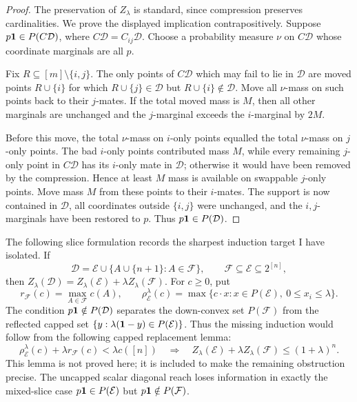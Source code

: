 \documentclass[12pt]{article}
\begin{document}
\begin{proof}
The preservation of \(Z_\lambda\) is standard, since compression preserves
cardinalities.  We prove the displayed implication contrapositively.  Suppose
\(p{\bf1}\in P(C\mathcal D)\), where \(C\mathcal D=C_{ij}\mathcal D\).  Choose a
probability measure \(\nu\) on \(C\mathcal D\) whose coordinate marginals are all
\(p\).

Fix \(R\subseteq[m]\setminus\{i,j\}\).  The only points of \(C\mathcal D\) which
may fail to lie in \(\mathcal D\) are moved points \(R\cup\{i\}\) for which
\(R\cup\{j\}\in\mathcal D\) but \(R\cup\{i\}\notin\mathcal D\).  Move all
\(\nu\)-mass on such points back to their \(j\)-mates.  If the total moved mass
is \(M\), then all other marginals are unchanged and the \(j\)-marginal exceeds
the \(i\)-marginal by \(2M\).

Before this move, the total \(\nu\)-mass on \(i\)-only points equalled the
total \(\nu\)-mass on \(j\)-only points.  The bad \(i\)-only points contributed
mass \(M\), while every remaining \(j\)-only point in \(C\mathcal D\) has its
\(i\)-only mate in \(\mathcal D\); otherwise it would have been removed by the
compression.  Hence at least \(M\) mass is available on swappable \(j\)-only
points.  Move mass \(M\) from these points to their \(i\)-mates.  The support is
now contained in \(\mathcal D\), all coordinates outside \(\{i,j\}\) were
unchanged, and the \(i,j\)-marginals have been restored to \(p\).  Thus
\(p{\bf1}\in P(\mathcal D)\).
\end{proof}

The following slice formulation records the sharpest induction target I have
isolated.  If
\[
 \mathcal D=\mathcal E\cup\{A\cup\{n+1\}:A\in\mathcal F\},\qquad
 \mathcal F\subseteq\mathcal E\subseteq2^{[n]},
\]
then \(Z_\lambda(\mathcal D)=Z_\lambda(\mathcal E)+\lambda Z_\lambda(\mathcal F)\).
For \(c\ge0\), put
\[
 r_{\mathcal F}(c)=\max_{A\in\mathcal F}c(A),\qquad
 \rho^\lambda_{\mathcal E}(c)=
 \max\{c\cdot x:x\in P(\mathcal E),\ 0\le x_i\le\lambda\}.
\]
The condition \(p{\bf1}\notin P(\mathcal D)\) separates the down-convex set
\(P(\mathcal F)\) from the reflected capped set
\(\{y:\lambda({\bf1}-y)\in P(\mathcal E)\}\).  Thus the missing induction would
follow from the following capped replacement lemma:
\[
 \rho^\lambda_{\mathcal E}(c)+\lambda r_{\mathcal F}(c)<\lambda c([n])
 \quad\Longrightarrow\quad
 Z_\lambda(\mathcal E)+\lambda Z_\lambda(\mathcal F)\le(1+\lambda)^n .
\]
This lemma is not proved here; it is included to make the remaining obstruction
precise.  The uncapped scalar diagonal reach loses information in exactly the
mixed-slice case \(p{\bf1}\in P(\mathcal E)\) but \(p{\bf1}\notin P(\mathcal F)\).
\end{document}
